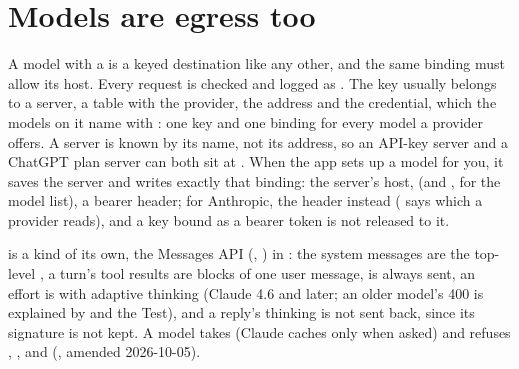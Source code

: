 \section{Models are egress too}

A model with a  is a keyed destination like any other, and
the same binding must allow its host. Every request is checked and logged
as . The key usually belongs to a server, a
 table with the provider, the address and the
credential, which the models on it name with : one
key and one binding for every model a provider offers. A server is known by
its name, not its address, so an API-key server and a ChatGPT plan server can
both sit at . When the app sets up
a model for you, it saves the server and writes exactly that binding: the
server's host,  (and , for the model list), a bearer
 header; for Anthropic, the  header
instead ( says which a provider reads), and a key bound
as a bearer token is not released to it.

 is a kind of its own, the Messages API
(, ) in
: the system messages are the top-level
, a turn's tool results are  blocks of one
user message,  is always sent, an effort is
 with adaptive thinking (Claude 4.6 and later; an
older model's 400 is explained by  and the Test), and a reply's
thinking is not sent back, since its signature is not kept. A model takes
 (Claude caches only when asked) and refuses
, ,  and 
(, amended 2026-10-05).

